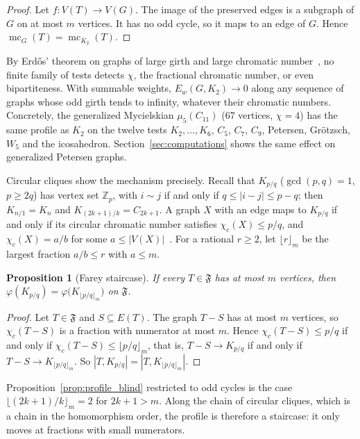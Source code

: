 \documentclass{article}
\newtheorem{proposition}[theorem]{Proposition}
\begin{document}
\begin{proof}
Let $f\colon V(T)\to V(G)$.  The image of the preserved edges is a subgraph
of $G$ on at most $m$ vertices.  It has no odd cycle, so it maps to an edge
of $G$.  Hence $\operatorname{mc}_G(T)=\operatorname{mc}_{K_2}(T)$.
\end{proof}

By Erd\H{o}s' theorem on graphs of large girth and large chromatic
number~\cite{erdos1959}, no finite family of tests detects $\chi$, the
fractional chromatic number, or even bipartiteness.  With summable weights,
$E_w(G,K_2)\to0$ along any sequence of graphs whose odd girth tends to
infinity, whatever their chromatic numbers.  Concretely, the generalized
Mycielskian $\mu_5(C_{11})$ ($67$ vertices, $\chi=4$) has the same profile
as $K_2$ on the twelve tests $K_2,\dots,K_6$, $C_5$, $C_7$, $C_9$, Petersen,
Gr\"otzsch, $W_5$ and the icosahedron.  Section~\ref{sec:computations}
shows the same effect on generalized Petersen graphs.

Circular cliques show the mechanism precisely.  Recall that $K_{p/q}$
($\gcd(p,q)=1$, $p\ge2q$) has vertex set $\mathbb Z_p$, with $i\sim j$ if
and only if $q\le|i-j|\le p-q$; then $K_{n/1}=K_n$ and
$K_{(2k+1)/k}=C_{2k+1}$.  A graph $X$ with an edge maps to $K_{p/q}$ if and
only if its circular chromatic number satisfies $\chi_c(X)\le p/q$, and
$\chi_c(X)=a/b$ for some $a\le|V(X)|$~\cite{vince1988,zhu2001}.  For a
rational $r\ge2$, let $\lfloor r\rfloor_m$ be the largest fraction $a/b\le r$
with $a\le m$.

\begin{proposition}[Farey staircase]
\label{prop:circular}
If every $T\in\mathfrak F$ has at most $m$ vertices, then
$\varphi(K_{p/q})=\varphi\bigl(K_{\lfloor p/q\rfloor_m}\bigr)$ on $\mathfrak F$.
\end{proposition}

\begin{proof}
Let $T\in\mathfrak F$ and $S\subseteq E(T)$.  The graph $T-S$ has at most
$m$ vertices, so $\chi_c(T-S)$ is a fraction with numerator at most $m$.
Hence $\chi_c(T-S)\le p/q$ if and only if
$\chi_c(T-S)\le\lfloor p/q\rfloor_m$, that is, $T-S\to K_{p/q}$ if and only
if $T-S\to K_{\lfloor p/q\rfloor_m}$.  So $|T,K_{p/q}|=|T,K_{\lfloor p/q\rfloor_m}|$.
\end{proof}

Proposition~\ref{prop:profile_blind} restricted to odd cycles is the case
$\lfloor (2k+1)/k\rfloor_m=2$ for $2k+1>m$.  Along the chain of circular
cliques, which is a chain in the homomorphism order, the profile is
therefore a staircase: it only moves at fractions with small numerators.
\end{document}
